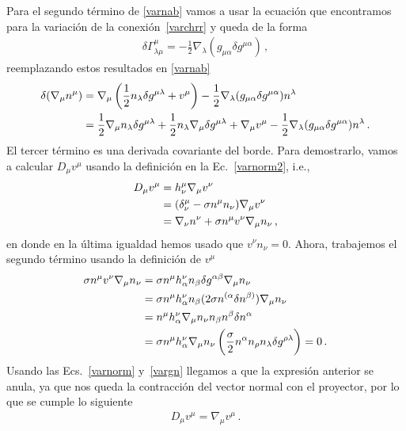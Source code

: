 \documentclass[../Main.tex]{subfiles}
\begin{document}
Para el segundo término de \eqref{varnab} vamos a usar la ecuación que encontramos para la variación de la conexión~\eqref{varchrr} y queda de la forma
\begin{align}
\delta\Gamma^{\mu}_{\lambda\mu}=-\frac{1}{2}\nabla_{\lambda}(g_{\mu\alpha}\delta g^{\mu\alpha}) \, ,  
\end{align}
reemplazando estos resultados en \eqref{varnab}
\begin{align}\notag
\delta (\nabla_{\mu}n^{\mu})&=\nabla_{\mu}\left(\frac{1}{2}n_{\lambda}\delta g^{\mu\lambda}+ v^{\mu}\right)-\frac{1}{2}\nabla_{\lambda}(g_{\mu\alpha}\delta g^{\mu\alpha})n^{\lambda}\\
&=\frac{1}{2}\nabla_{\mu}n_{\lambda}\delta g^{\mu\lambda}+\frac{1}{2}n_{\lambda}\nabla_{\mu}\delta g^{\mu\lambda}+\nabla_{\mu}v^{\mu}-\frac{1}{2}\nabla_{\lambda}(g_{\mu\alpha}\delta g^{\mu\alpha})n^{\lambda}\, .
\end{align}
El tercer término es una derivada covariante del borde. Para demostrarlo, vamos a calcular $D_{\mu}v^{\mu}$ usando la definición en la Ec.~\eqref{varnorm2}, i.e.,
\begin{align}\notag
D_{\mu}v^{\mu}&=h^{\mu}_{\nu}\nabla_{\mu}v^{\nu}\\ \notag
&=(\delta^{\mu}_{\nu}-\sigma n^{\mu}n_{\nu})\nabla_{\mu}v^{\nu}\\
&=\nabla_{\nu}n^{\nu}+\sigma n^{\mu}v^{\nu}\nabla_{\mu}n_{\nu}\, ,
\end{align}
en donde en la última igualdad hemos usado que $v^{\nu}n_{\nu}=0$. Ahora, trabajemos el segundo término usando la definición de $v^{\mu}$
\begin{align}\notag
\sigma n^{\mu}v^{\nu}\nabla_{\mu}n_{\nu}&=\sigma n^{\mu}h^{\nu}_{\alpha}n_{\beta}\delta g^{\alpha\beta}\nabla_{\mu}n_{\nu}\\ \notag
&=\sigma n^{\mu}h^{\nu}_{\alpha}n_{\beta}(2\sigma n^{(\alpha}\delta n^{\beta)})\nabla_{\mu}n_{\nu}\\ \notag
&=n^{\mu}h^{\nu}_{\alpha}\nabla_{\mu}n_{\nu}n_{\beta}n^{\beta}\delta n^{\alpha}\\
&=\sigma n^{\mu}h^{\nu}_{\alpha}\nabla_{\mu}n_{\nu}\left(\frac{\sigma}{2}n^{\alpha}n_{\rho}n_{\lambda}\delta g^{\rho\lambda}\right)=0 \, .\label{zero}
\end{align}
Usando las Ecs.~\eqref{varnorm} y~\eqref{vargn} llegamos a que la expresión anterior se anula, ya que nos queda la contracción del vector normal con el proyector, por lo que se cumple lo siguiente
\begin{align}
    D_{\mu}v^{\mu}=\nabla_{\mu}v^{\mu}\, .
\end{align}
\end{document}
